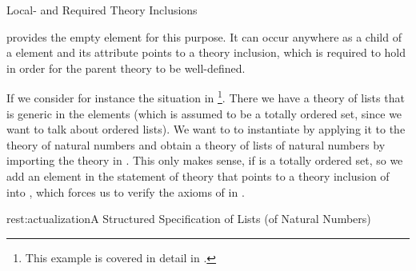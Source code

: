 \begin{omgroup}[id=complex-theories,short=Complex Theories,
                            creators=miko,contributors=frabe]
\begin{omgroup}[id=restricting-inference,short=Local/Required Theory Inclusions]{Local- and
  Required Theory Inclusions}
\begin{module}[id=restinf]
\begin{definition}[id=inclusion.def] 
  {\omdoc} provides the empty {} element for this purpose. It can occur
  anywhere as a child of a {} element and its {}
  attribute points to a theory inclusion, which is required to hold in order for the
  parent theory to be well-defined.
\end{definition}  

If we consider for instance the situation in {}\footnote{This
  example is covered in detail in {}.}.  There we have a theory
{} of lists that is generic in the elements (which is assumed to be a
totally ordered set, since we want to talk about ordered lists). We want to to instantiate
{} by applying it to the theory {} of natural numbers and
obtain a theory {} of lists of natural numbers by importing the theory
{} in {}. This only makes sense, if
{} is a totally ordered set, so we add an {} element in
the statement of theory {} that points to a theory inclusion of
{} into {}, which forces us to verify the axioms of
{} in {}.

\begin{myfig}{rest:actualization}{A Structured Specification of Lists (of
    Natural Numbers)}
  \quad
\end{myfig}


\end{module}
\end{omgroup}
\end{omgroup}

